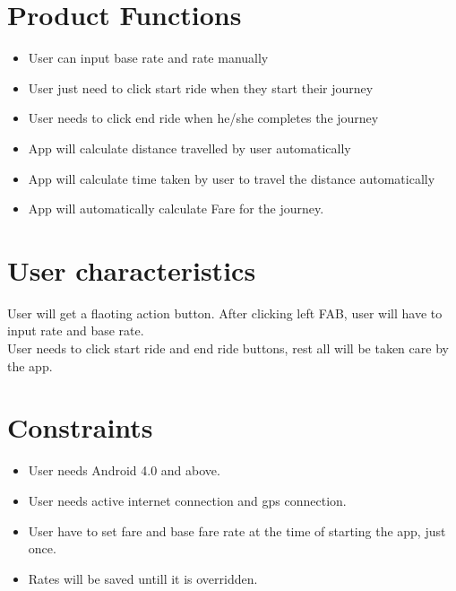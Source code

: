 \section{Product Functions}
\begin{itemize}
	\item User can input base rate and rate manually
	\item User just need to click start ride when they start their journey
	\item User needs to click end ride when he/she completes the journey
	\item App will calculate distance travelled by user automatically
	\item App will calculate time taken by user to travel the distance automatically
	\item App will automatically calculate Fare for the journey.\\
\end{itemize}
\section{User characteristics}
User will get a flaoting action button. After clicking left FAB, user will have to input rate and base rate.\\
User needs to click start ride and end ride buttons, rest all will be taken care by the app.
\section{Constraints} 
\begin{itemize}
	\item User needs Android 4.0 and above.
	\item User needs active internet connection and gps connection.
	\item User have to set fare and base fare rate at the time of starting the app, just once.
	\item Rates will be saved untill it is overridden.
\end{itemize}
